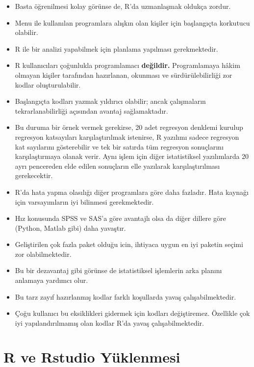 \documentclass[
  oneside]{book}
\begin{document}
\begin{itemize}
\item
  Basta öğrenilmesi kolay görünse de, R'da uzmanlaşmak oldukça zordur.
\item
  Menu ile kullanılan programlara alışkın olan kişiler için başlangıçta korkutucu olabilir.
\item
  R ile bir analizi yapabilmek için planlama yapılması gerekmektedir.
\item
  R kullanıcıları çoğunlukla programlamacı \textbf{değildir.} Programlamaya hâkim olmayan kişiler tarafından hazırlanan, okunması ve sürdürülebilirliği zor kodlar oluşturulabilir.
\item
  Başlangıçta kodları yazmak yıldırıcı olabilir; ancak çalışmaların tekrarlanabilirliği açısından avantaj sağlamaktadır.
\item
  Bu duruma bir örnek vermek gerekirse, 20 adet regresyon denklemi kurulup regresyon katsayıları karşılaştırılmak istenirse, R yazılımı sadece regresyon kat sayılarını gösterebilir ve tek bir satırda tüm regresyon sonuçlarını karşılaştırmaya olanak verir. Aynı işlem için diğer istatistiksel yazılımlarda 20 ayrı pencereden elde edilen sonuçların elle yazılarak karşılaştırılması gerekecektir.
\item
  R'da hata yapma olasılığı diğer programlara göre daha fazladır. Hata kaynağı için varsayımların iyi bilinmesi gerekmektedir.
\item
  Hız konusunda SPSS ve SAS'a göre avantajlı olsa da diğer dillere göre (Python, Matlab gibi) daha yavaştır.
\item
  Geliştirilen çok fazla paket olduğu icin, ihtiyaca uygun en iyi paketin seçimi zor olabilmektedir.
\item
  Bu bir dezavantaj gibi görünse de istatistiksel işlemlerin arka planını anlamaya yardımcı olur.
\item
  Bu tarz zayıf hazırlanmış kodlar farklı koşullarda yavaş çalışabilmektedir.
\item
  Çoğu kullanıcı bu eksiklikleri gidermek için kodları değiştiremez. Özellikle çok iyi yapılandırılmamış olan kodlar R'da yavaş çalışabilmektedir.
\end{itemize}

\hypertarget{r-ve-rstudio-yuxfcklenmesi}{%
\section{R ve Rstudio Yüklenmesi}\label{r-ve-rstudio-yuxfcklenmesi}}
\end{document}
